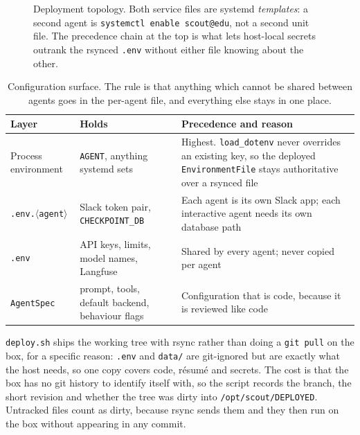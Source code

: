 \documentclass[11pt,a4paper]{article}
\newcommand{\tablefont}{\footnotesize}
\begin{document}
\begin{figure}[!ht]
\begin{adjustbox}{max width=\textwidth}
\end{adjustbox}
\caption{Deployment topology. Both service files are systemd \emph{templates}: a second agent
is \texttt{systemctl enable scout@edu}, not a second unit file. The precedence chain at the
top is what lets host-local secrets outrank the rsynced \texttt{.env} without either file
knowing about the other.}
\label{fig:deploy}
\end{figure}

\begin{table}[!ht]
\centering\tablefont
\caption{Configuration surface. The rule is that anything which cannot be shared between
agents goes in the per-agent file, and everything else stays in one place.}
\label{tab:config}
\begin{tabularx}{\textwidth}{L{3.6cm} L{3.4cm} X}
\toprule
\textbf{Layer} & \textbf{Holds} & \textbf{Precedence and reason} \\
\midrule
Process environment & \texttt{AGENT}, anything systemd sets & Highest.
  \texttt{load\_\allowbreak{}dotenv} never overrides an existing key, so the deployed
  \texttt{EnvironmentFile} stays authoritative over a rsynced file \\
\texttt{.env.$\langle$agent$\rangle$} & Slack token pair, \texttt{CHECKPOINT\_\allowbreak{}DB} & Each
  agent is its own Slack app; each interactive agent needs its own database path \\
\texttt{.env} & API keys, limits, model names, Langfuse & Shared by every agent; never
  copied per agent \\
\texttt{AgentSpec} & prompt, tools, default backend, behaviour flags & Configuration that is
  code, because it is reviewed like code \\
\bottomrule
\end{tabularx}
\end{table}

\texttt{deploy.sh} ships the working tree with rsync rather than doing a \texttt{git pull} on
the box, for a specific reason: \texttt{.env} and \texttt{data/} are git-ignored but are
exactly what the host needs, so one copy covers code, résumé and secrets. The cost is that
the box has no git history to identify itself with, so the script records the branch, the
short revision and whether the tree was dirty into \texttt{/opt/scout/DEPLOYED}. Untracked
files count as dirty, because rsync sends them and they then run on the box without appearing
in any commit.
\end{document}
